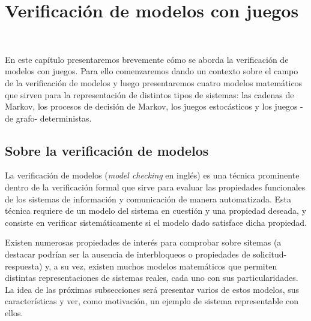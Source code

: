 \chapter{Verificación de modelos con juegos}
~\label{cap:modelos}
\vspace{-1cm}

En este capítulo presentaremos brevemente cómo se aborda la verificación de
modelos con juegos. Para ello comenzaremos dando un contexto sobre el campo de
la verificación de modelos y luego presentaremos cuatro modelos matemáticos que
sirven para la representación de distintos tipos de sistemas: las cadenas de
Markov, los procesos de decisión de Markov, los juegos estocásticos y los
juegos -de grafo- deterministas.


\section{Sobre la verificación de modelos}

La verificación de modelos (\textit{model checking} en inglés) es una técnica
prominente dentro de la verificación formal que sirve para evaluar las
propiedades funcionales de los sistemas de información y comunicación de manera
automatizada. Esta técnica requiere de un modelo del sistema en cuestión y una
propiedad deseada, y consiste en verificar sistemáticamente si el modelo dado
satisface dicha propiedad.

Existen numerosas propiedades de interés para comprobar sobre sitemas (a
destacar podrían ser la ausencia de interbloqueos o propiedades de
solicitud-respuesta) y, a su vez, existen muchos modelos matemáticos que
permiten distintas representaciones de sistemas reales, cada uno con sus
particularidades. La idea de las próximas subsecciones será presentar varios de
estos modelos, sus características y ver, como motivación, un ejemplo de
sistema representable con ellos.

